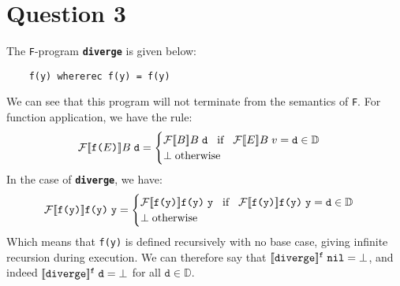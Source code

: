 \documentclass{article}
\begin{document}
\section*{Question 3}
The \texttt{F}-program \textbf{\texttt{diverge}} is given below:
\begin{verbatim}
    f(y) whererec f(y) = f(y)
\end{verbatim}
We can see that this program will not terminate from the semantics of \texttt{F}. For function application, we have the rule:
\begin{equation*}
    \mathcal{F} [\![ \texttt{f(}E\texttt{)} ]\!] B \hspace{1mm} \texttt{d} = \begin{cases}
        \mathcal{F} [\![ B ]\!] B \hspace{1mm} \texttt{d} \hspace{3mm} \text{if} \hspace{3mm} \mathcal{F} [\![ E ]\!] B \hspace{1mm} v = \texttt{d} \in \mathbb{D} \\
        \bot \hspace{1mm} \text{otherwise}
    \end{cases}
\end{equation*}
In the case of \textbf{\texttt{diverge}}, we have:
\begin{equation*}
    \mathcal{F} [\![ \texttt{f(y)} ]\!] \texttt{f(y)} \hspace{1mm} \texttt{y} = \begin{cases}
        \mathcal{F} [\![ \texttt{f(y)} ]\!] \texttt{f(y)} \hspace{1mm} \texttt{y} \hspace{3mm} \text{if} \hspace{3mm} \mathcal{F} [\![ \texttt{f(y)} ]\!] \texttt{f(y)} \hspace{1mm} \texttt{y} = \texttt{d} \in \mathbb{D} \\
        \bot \hspace{1mm} \text{otherwise}
    \end{cases}
\end{equation*}
Which means that \texttt{f(y)} is defined recursively with no base case, giving infinite recursion during execution. We can therefore say that $[\![\texttt{diverge}]\!]^{\texttt{f}} \hspace{1mm} \texttt{nil} = \bot$, and indeed $[\![\texttt{diverge}]\!]^{\texttt{f}} \hspace{1mm} \texttt{d} = \bot$ for all $\texttt{d} \in \mathbb{D}$.
\end{document}
